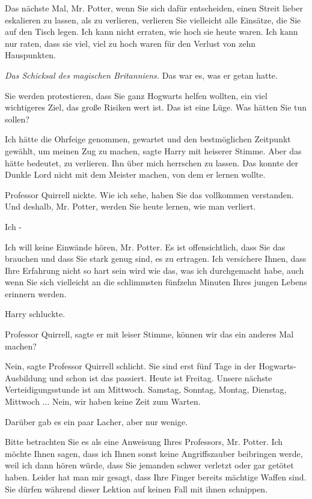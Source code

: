 \glqq{}Das nächste Mal, Mr. Potter, wenn Sie sich dafür entscheiden, einen Streit
lieber eskalieren zu lassen, als zu verlieren, verlieren Sie vielleicht alle
Einsätze, die Sie auf den Tisch legen. Ich kann nicht erraten, wie hoch sie
heute waren. Ich kann nur raten, dass sie viel, viel zu hoch waren für den
Verlust von zehn Hauspunkten.\grqq{}

\emph{Das Schicksal des magischen Britanniens.}
Das war es, was er getan hatte.

\glqq{}Sie werden protestieren, dass Sie ganz Hogwarts helfen wollten, ein viel
wichtigeres Ziel, das große Risiken wert ist. Das ist eine Lüge. Was hätten Sie
tun sollen?\grqq{}

\glqq{}Ich hätte die Ohrfeige genommen, gewartet und den bestmöglichen Zeitpunkt
gewählt, um meinen Zug zu machen\grqq{}, sagte Harry mit heiserer Stimme. \glqq{}
Aber das hätte bedeutet, zu verlieren. Ihn über mich herrschen zu lassen. Das
konnte der Dunkle Lord nicht mit dem Meister machen, von dem er lernen
wollte.\grqq{}

Professor Quirrell nickte. \glqq{}Wie ich sehe, haben Sie das vollkommen
verstanden. Und deshalb, Mr. Potter, werden Sie heute lernen, wie man
verliert.\grqq{}

\glqq{}Ich -\grqq{}

\glqq{}Ich will keine Einwände hören, Mr. Potter. Es ist offensichtlich, dass Sie
das brauchen und dass Sie stark genug sind, es zu ertragen. Ich versichere
Ihnen, dass Ihre Erfahrung nicht so hart sein wird wie das, was ich durchgemacht
habe, auch wenn Sie sich vielleicht an die schlimmsten fünfzehn Minuten Ihres
jungen Lebens erinnern werden.\grqq{}

Harry schluckte.

\glqq{}Professor Quirrell\grqq{}, sagte er mit leiser Stimme, \glqq{}können wir
das ein anderes Mal machen?\grqq{}

\glqq{}Nein\grqq{}, sagte Professor Quirrell schlicht. \glqq{}Sie sind erst fünf
Tage in der Hogwarts-Ausbildung und schon ist das passiert. Heute ist Freitag.
Unsere nächste Verteidigungsstunde ist am Mittwoch. Samstag, Sonntag, Montag,
Dienstag, Mittwoch ... Nein, wir haben keine Zeit zum Warten.\grqq{}

Darüber gab es ein paar Lacher, aber nur wenige.

\glqq{}Bitte betrachten Sie es als eine Anweisung Ihres Professors, Mr. Potter.
Ich möchte Ihnen sagen, dass ich Ihnen sonst keine Angriffszauber beibringen
werde, weil ich dann hören würde, dass Sie jemanden schwer verletzt oder gar
getötet haben. Leider hat man mir gesagt, dass Ihre Finger bereits mächtige
Waffen sind. Sie dürfen während dieser Lektion auf keinen Fall mit ihnen
schnippen.\grqq{}

